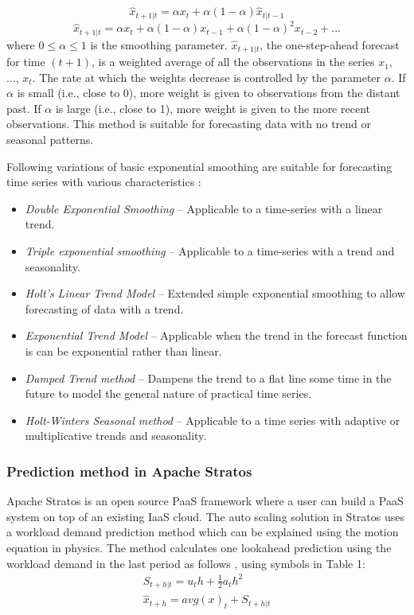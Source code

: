 \begin{equation}
\hat{x}_{t+1|t}=\alpha x_t +\alpha(1-\alpha)\hat{x}_{t|t-1}
\end{equation}
\begin{equation}
\hat{x}_{t+1|t}=\alpha x_t +\alpha(1-\alpha)x_{t-1}+\alpha(1-\alpha)^2x_{t-2}+...
\end{equation}
where $0\leq \alpha \leq 1$ is the smoothing parameter. $\hat{x}_{t+1|t}$, the one-step-ahead forecast for time $(t+1)$, is a weighted average of all the observations in the series $x_1$, ..., $x_t$. The rate at which the weights decrease is controlled by the parameter $\alpha$. If $\alpha$ is small (i.e., close to 0), more weight is given to observations from the distant past. If $\alpha$ is large (i.e., close to 1), more weight is given to the more recent observations. This method is suitable for forecasting data with no trend or seasonal patterns.

Following variations of basic exponential smoothing are suitable for forecasting time series with various characteristics \cite{Forecasting_OTexts}:

\begin{itemize}
\item \textit{Double Exponential Smoothing} -- Applicable to a time-series with a linear trend.
\item \textit{Triple exponential smoothing} -- Applicable to a time-series with a trend and seasonality.
\item \textit{Holt's Linear Trend Model} -- Extended simple exponential smoothing to allow forecasting of data with a trend.
\item \textit{Exponential Trend Model} -- Applicable when the trend in the forecast function is can be exponential rather than linear.
\item \textit{Damped Trend method} -- Dampens the trend to a flat line some time in the future to model the general nature of practical time series.
\item \textit{Holt-Winters Seasonal method} -- Applicable to a time series with adaptive or multiplicative trends and seasonality.
\end{itemize}

\subsubsection{Prediction method in Apache Stratos}
Apache Stratos is an open source PaaS framework where a user can build a PaaS system on top of an existing IaaS cloud. The auto scaling solution in Stratos uses a workload demand prediction method which can be explained using the motion equation in physics. The method calculates one lookahead prediction using the workload demand in the last period as follows \cite{StratosModel}, using symbols in Table 1:
\begin{eqnarray}
S_{t+h|t} = u_{t}h+ \frac{1}{2} a_{t}h^2 \\
\hat{x}_{t+h}=avg(x)_{t} + S_{t+h|t} 
\end{eqnarray}

